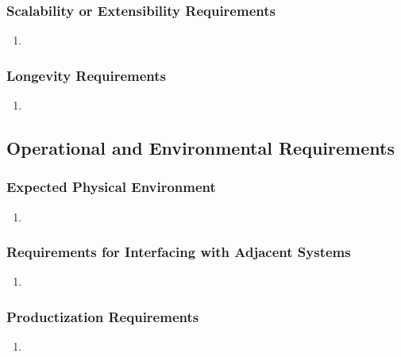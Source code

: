 \documentclass[]{article}
\begin{document}
\subsubsection{Scalability or Extensibility Requirements}
\label{ssub:scalability_or_extensibility_requirements}
\begin{enumerate}[label={PR-SE\arabic*.}]
    \item 
\end{enumerate}

\subsubsection{Longevity Requirements}
\label{ssub:longevity_requirements}
\begin{enumerate}[label={PR-L\arabic*.}]
    \item 
\end{enumerate}


\subsection{Operational and Environmental Requirements}
\label{sub:operational_and_environmental_requirements}

\subsubsection{Expected Physical Environment}
\label{ssub:expected_physical_environment}
\begin{enumerate}[label={OE-EPE\arabic*.}]
    \item 
\end{enumerate}

\subsubsection{Requirements for Interfacing with Adjacent Systems}
\label{ssub:requirements_for_interfacing_with_adjacent_systems}
\begin{enumerate}[label={OE-IA\arabic*.}]
    \item 
\end{enumerate}

\subsubsection{Productization Requirements}
\label{ssub:productization_requirements}
\begin{enumerate}[label={OE-P\arabic*.}]
    \item 
\end{enumerate}
\end{document}

